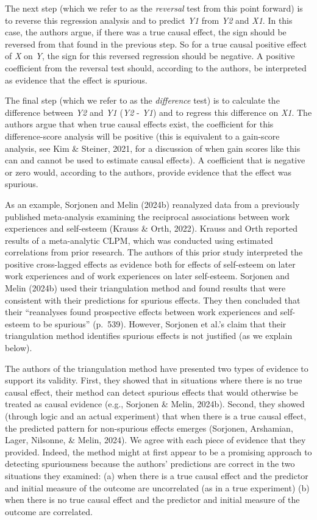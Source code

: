\documentclass[
  man,floatsintext]{apa6}
\begin{document}
The next step (which we refer to as the \emph{reversal} test from this point forward) is to reverse this regression analysis and to predict \emph{Y1} from \emph{Y2} and \emph{X1}. In this case, the authors argue, if there was a true causal effect, the sign should be reversed from that found in the previous step. So for a true causal positive effect of \emph{X} on \emph{Y}, the sign for this reversed regression should be negative. A positive coefficient from the reversal test should, according to the authors, be interpreted as evidence that the effect is spurious.

The final step (which we refer to as the \emph{difference} test) is to calculate the difference between \emph{Y2} and \emph{Y1} (\emph{Y2} - \emph{Y1}) and to regress this difference on \emph{X1}. The authors argue that when true causal effects exist, the coefficient for this difference-score analysis will be positive (this is equivalent to a gain-score analysis, see Kim \& Steiner, 2021, for a discussion of when gain scores like this can and cannot be used to estimate causal effects). A coefficient that is negative or zero would, according to the authors, provide evidence that the effect was spurious.

As an example, Sorjonen and Melin (2024b) reanalyzed data from a previously published meta-analysis examining the reciprocal associations between work experiences and self-esteem (Krauss \& Orth, 2022). Krauss and Orth reported results of a meta-analytic CLPM, which was conducted using estimated correlations from prior research. The authors of this prior study interpreted the positive cross-lagged effects as evidence both for effects of self-esteem on later work experiences and of work experiences on later self-esteem. Sorjonen and Melin (2024b) used their triangulation method and found results that were consistent with their predictions for spurious effects. They then concluded that their ``reanalyses found prospective effects between work experiences and self-esteem to be spurious'' (p.~539). However, Sorjonen et al.'s claim that their triangulation method identifies spurious effects is not justified (as we explain below).

The authors of the triangulation method have presented two types of evidence to support its validity. First, they showed that in situations where there is no true causal effect, their method can detect spurious effects that would otherwise be treated as causal evidence (e.g., Sorjonen \& Melin, 2024b). Second, they showed (through logic and an actual experiment) that when there is a true causal effect, the predicted pattern for non-spurious effects emerges (Sorjonen, Arshamian, Lager, Nilsonne, \& Melin, 2024). We agree with each piece of evidence that they provided. Indeed, the method might at first appear to be a promising approach to detecting spuriousness because the authors' predictions are correct in the two situations they examined: (a) when there is a true causal effect and the predictor and initial measure of the outcome are uncorrelated (as in a true experiment) (b) when there is no true causal effect and the predictor and initial measure of the outcome are correlated.
\end{document}
